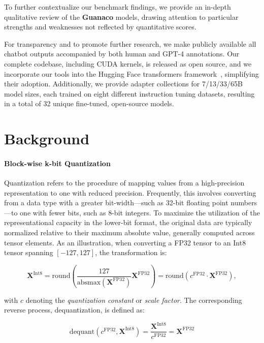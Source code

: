 To further contextualize our benchmark findings, we provide an in-depth qualitative review of the \textbf{Guanaco} models, drawing attention to particular strengths and weaknesses not reflected by quantitative scores.

For transparency and to promote further research, we make publicly available all chatbot outputs accompanied by both human and GPT-4 annotations. Our complete codebase, including CUDA kernels, is released as open source, and we incorporate our tools into the Hugging Face transformers framework~\citep{wolf2019huggingface}, simplifying their adoption. Additionally, we provide adapter collections for 7/13/33/65B model sizes, each trained on eight different instruction tuning datasets, resulting in a total of 32 unique fine-tuned, open-source models.

\section{Background}
\paragraph{Block-wise k-bit Quantization} Quantization refers to the procedure of mapping values from a high-precision representation to one with reduced precision. Frequently, this involves converting from a data type with a greater bit-width—such as 32-bit floating point numbers—to one with fewer bits, such as 8-bit integers. To maximize the utilization of the representational capacity in the lower-bit format, the original data are typically normalized relative to their maximum absolute value, generally computed across tensor elements. As an illustration, when converting a FP32 tensor to an Int8 tensor spanning $[-127, 127]$, the transformation is:

\begin{equation}
    \mathbf{X}^{ \text{Int8}} = \text{round}\left( \frac{127}{{\text{absmax}}(\mathbf{X}^{{\text{FP32}}})}\mathbf{X}^{{\text{FP32}}} \right) = \text{round}(c^{\text{FP32}}\cdot \mathbf{X}^{{\text{FP32}}}),
\end{equation}

with $c$ denoting the {\em quantization constant} or {\em scale factor}. The corresponding reverse process, dequantization, is defined as:

\begin{equation}
    \text{dequant}(c^{\text{FP32}}, \mathbf{X}^{\text{Int8}}) = \frac{\mathbf{X}^{\text{Int8}}}{c^{\text{FP32}}} = \mathbf{X}^{\text{FP32}}
\end{equation}

